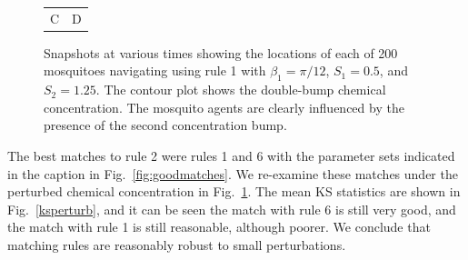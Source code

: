 \documentclass[12pt]{article}
\begin{document}
\begin{figure}[htp]
\begin{tabular}{cc}
	C & D 
\end{tabular}
\caption{Snapshots at various times showing the locations of each of 200 mosquitoes navigating using rule 1 with $\beta_1 = \pi/12$, $S_1 = 0.5$, and $S_2 = 1.25$. The contour plot shows the double-bump chemical concentration. The mosquito agents are clearly influenced by the presence of the second concentration bump.}
\label{mosqvizperturb}
\end{figure}


The best matches to rule 2 were rules 1 and 6 with the parameter sets indicated in the caption in Fig.~\ref{fig:goodmatches}. We re-examine these matches under the perturbed chemical concentration in Fig.~\ref{mosqvizperturb}. The mean KS statistics are shown in Fig.~\ref{ksperturb}, and it can be seen the match with rule 6 is still very good, and the match with rule 1 is still reasonable, although poorer. We conclude that matching rules are reasonably robust to small perturbations.
\end{document}
